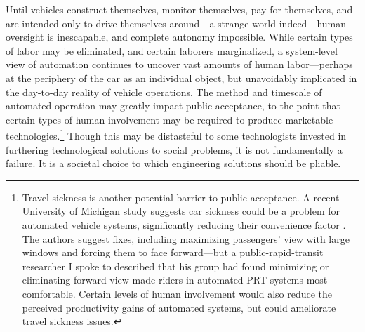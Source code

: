Until
vehicles construct themselves, monitor themselves, pay for themselves,
and are intended only to drive themselves around---a strange world
indeed---human oversight is inescapable, and complete autonomy
impossible. While certain types of
labor may be eliminated, and certain laborers marginalized, a
system-level view of automation continues to uncover vast amounts of
human labor---perhaps at the periphery of the car as an individual
object, but unavoidably implicated in the day-to-day reality of
vehicle operations. The method and timescale of automated
operation may greatly impact 
public acceptance, to the point that certain types of human
involvement may be required to produce marketable
technologies.\footnote{Travel sickness is another potential barrier to
  public acceptance. A
  recent University of Michigan study suggests car sickness could be a
  problem for automated vehicle systems,  significantly reducing their
  convenience factor
  \cite{SivakSchoettleSick}. The authors suggest fixes, including
  maximizing passengers' view with large windows and forcing them to
  face forward---but a
  public-rapid-transit researcher I spoke to described that his group
  had found minimizing or eliminating forward view made riders in
  automated PRT systems
  most comfortable.
  Certain levels of human involvement would also reduce the perceived productivity
  gains of automated systems, but could ameliorate travel sickness
  issues.} Though
this may be distasteful to some technologists invested in furthering
technological solutions to social problems, it is not fundamentally
a failure. It is a societal choice to which engineering solutions
should be pliable.


